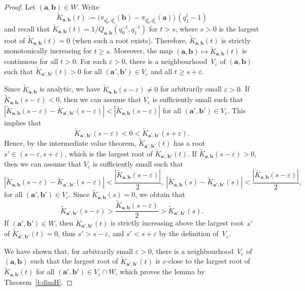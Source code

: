 \documentclass{amsart}
\theoremstyle{definition}
\numberwithin{equation}{section}
\newcommand{\ba}{\mathbf{a}}
\newcommand{\bb}{\mathbf{b}}
\begin{document}
\begin{proof}
Let $(\ba,\bb) \in W$.
Write 
\[
\tilde{K}_{\ba, \bb}(t) := \big(\pi_{q_0^t,q_1^t}(\bb) - \pi_{q_0^t,q_1^t}(\ba)\big)\,  (q_1^t{-}1)
\]
and recall that $\tilde{K}_{\ba, \bb}(t) = 1/Q_{\ba,\bb}(q_0^{-t},q_1^{-t})$ for $t > s$, where $s > 0$ is the largest root of $\tilde{K}_{\ba, \bb}(t) = 0$ (when such a root exists).
Therefore, $\tilde{K}_{\ba, \bb}(t)$ is strictly monotonically increasing for $t \ge s$. 
Moreover, the map $(\ba,\bb) \mapsto \tilde{K}_{\ba,\bb}(t)$ is continuous for all $t > 0$.
For each $\varepsilon > 0$, there is a neighbourhood~$V_\varepsilon$ of $(\ba,\bb)$ such that $\tilde{K}_{\ba',\bb'}(t) > 0$ for all $(\ba',\bb') \in V_\varepsilon$ and all $t \ge s{+}\varepsilon$.

Since $\tilde{K}_{\ba,\bb}$ is analytic, we have $\tilde{K}_{\ba,\bb}(s{-}\varepsilon) \ne 0$ for arbitrarily small $\varepsilon > 0$.
If $\tilde{K}_{\ba,\bb}(s{-}\varepsilon) < 0$, then we can assume that $V_\varepsilon$ is sufficiently small such that $|\tilde{K}_{\ba, \bb}(s{-}\varepsilon) - \tilde{K}_{\ba', \bb'}(s{-}\varepsilon)| < |\tilde{K}_{\ba, \bb}(s{-}\varepsilon)|$ for all $(\ba',\bb') \in V_\varepsilon$.
This implies that
\[
\tilde{K}_{\ba', \bb'}(s{-}\varepsilon) < 0 < \tilde{K}_{\ba', \bb'}(s{+}\varepsilon).
\]
Hence, by the intermediate value theorem, $\tilde{K}_{\ba', \bb'}(t)$ has a root $s' \in (s{-}\varepsilon, s{+}\varepsilon)$, which is the largest root of $\tilde{K}_{\ba', \bb'}(t)$.
If $\tilde{K}_{\ba,\bb}(s{-}\varepsilon) > 0$, then we can assume that $V_\varepsilon$ is sufficiently small such that
\[
|\tilde{K}_{\ba, \bb}(s{-}\varepsilon) - \tilde{K}_{\ba', \bb'}(s{-}\varepsilon)| < \frac{|\tilde{K}_{\ba, \bb}(s{-}\varepsilon)|}{2},\ |\tilde{K}_{\ba, \bb}(s) - \tilde{K}_{\ba',\bb'}(s)| < \frac{|\tilde{K}_{\ba, \bb}(s{-}\varepsilon)|}{2},
\]
for all $(\ba',\bb') \in V_\varepsilon$. 
Since $\tilde{K}_{\ba, \bb}(s) = 0$, we obtain that \[\tilde{K}_{\ba', \bb'}(s{-}\varepsilon) > \frac{\tilde{K}_{\ba, \bb}(s{-}\varepsilon)}{2} > \tilde{K}_{\ba', \bb'}(s).
\]
If $(\ba',\bb') \in W$, then $\tilde{K}_{\ba',\bb'}(t)$ is strictly increasing above the largest root~$s'$ of $\tilde{K}_{\ba', \bb'}(t) = 0$, thus $s' > s{-}\varepsilon$, and $s' < s{+}\varepsilon$ by the definition of~$V_\varepsilon$.

We have shown that, for arbitrarily small $\varepsilon > 0$, there is a neighbourhood~$V_\varepsilon$ of $(\ba,\bb)$ such that the largest root of $\tilde{K}_{\ba',\bb'}(t)$ is $\varepsilon$-close to the largest root of $\tilde{K}_{\ba,\bb}(t)$ for all $(\ba',\bb') \in V_\varepsilon \cap W$, which proves the lemma by Theorem~\ref{t:dimH}.
\end{proof}
\end{document}
